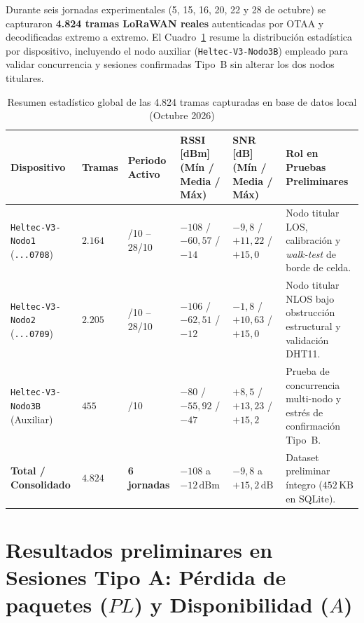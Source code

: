 \documentclass[12pt,oneside,openany,spanish,oldfontcommands]{memoir}
\begin{document}
Durante seis jornadas experimentales (5, 15, 16, 20, 22 y 28 de octubre) se capturaron \textbf{4.824 tramas LoRaWAN reales} autenticadas por OTAA y decodificadas extremo a extremo. El Cuadro~\ref{tab:dataset-global} resume la distribución estadística por dispositivo, incluyendo el nodo auxiliar (\texttt{Heltec-V3-Nodo3B}) empleado para validar concurrencia y sesiones confirmadas Tipo~B sin alterar los dos nodos titulares.

\begin{table}[!htbp]
\centering
\caption{Resumen estadístico global de las 4.824 tramas capturadas en base de datos local (Octubre 2026)}
\label{tab:dataset-global}
\scriptsize
\setlength{\tabcolsep}{2.5pt}
\begin{tabularx}{\textwidth}{
  >{\bfseries\raggedright\arraybackslash}p{2.2cm}
  >{\centering\arraybackslash}p{1.0cm}
  >{\centering\arraybackslash}p{1.6cm}
  >{\centering\arraybackslash}p{2.0cm}
  >{\centering\arraybackslash}p{1.9cm}
  >{\raggedright\arraybackslash}X
}
\toprule
\textbf{Dispositivo} & \textbf{Tramas} & \textbf{Periodo Activo} & \textbf{RSSI [dBm] (Mín / Media / Máx)} & \textbf{SNR [dB] (Mín / Media / Máx)} & \textbf{Rol en Pruebas Preliminares} \\
\midrule
\texttt{Heltec-V3-Nodo1} (\texttt{...0708}) &
$2.164$ &
05/10 -- 28/10 &
$-108$ / $-60,57$ / $-14$ &
$-9,8$ / $+11,22$ / $+15,0$ &
Nodo titular LOS, calibración y \textit{walk-test} de borde de celda. \\
\midrule
\texttt{Heltec-V3-Nodo2} (\texttt{...0709}) &
$2.205$ &
15/10 -- 28/10 &
$-106$ / $-62,51$ / $-12$ &
$-1,8$ / $+10,63$ / $+15,0$ &
Nodo titular NLOS bajo obstrucción estructural y validación DHT11. \\
\midrule
\texttt{Heltec-V3-Nodo3B} (Auxiliar) &
$455$ &
28/10 &
$-80$ / $-55,92$ / $-47$ &
$+8,5$ / $+13,23$ / $+15,2$ &
Prueba de concurrencia multi-nodo y estrés de confirmación Tipo~B. \\
\midrule
\textbf{Total / Consolidado} &
$\mathbf{4.824}$ &
\textbf{6 jornadas} &
$-108$ a $-12\,\text{dBm}$ &
$-9,8$ a $+15,2\,\text{dB}$ &
Dataset preliminar íntegro ($452\,\text{KB}$ en SQLite). \\
\bottomrule
\end{tabularx}
\end{table}

\section{Resultados preliminares en Sesiones Tipo A: Pérdida de paquetes ($PL$) y Disponibilidad ($A$)}\label{sec:resultados-tipo-a}
\end{document}
